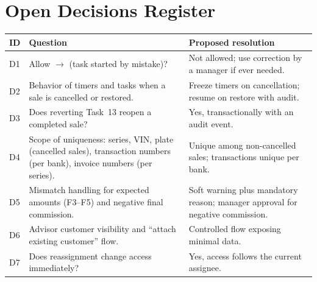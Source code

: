 \documentclass[11pt,a4paper]{article}
\newcommand{\code}[1]{\texttt{\detokenize{#1}}}
\begin{document}
\appendix
\section{Open Decisions Register}\label{app:open}

\begin{longtable}{@{}L{1.0cm}L{8.2cm}L{6.6cm}@{}}
	\toprule
	\textbf{ID} & \textbf{Question}                                                                                                        & \textbf{Proposed resolution}                                                         \\
	\midrule
	\endhead
	D1          & Allow \code{in_progress} $\rightarrow$ \code{pending} (task started by mistake)?                                         & Not allowed; use correction by a manager if ever needed.                             \\
	D2          & Behavior of timers and tasks when a sale is cancelled or restored.                                                       & Freeze timers on cancellation; resume on restore with audit.                         \\
	D3          & Does reverting Task~13 reopen a completed sale?                                                                          & Yes, transactionally with an audit event.                                            \\
	D4          & Scope of uniqueness: series, VIN, plate (cancelled sales), transaction numbers (per bank), invoice numbers (per series). & Unique among non-cancelled sales; transactions unique per bank.                      \\
	D5          & Mismatch handling for expected amounts (F3--F5) and negative final commission.                                           & Soft warning plus mandatory reason; manager approval for negative commission.        \\
	D6          & Advisor customer visibility and ``attach existing customer'' flow.                                                       & Controlled flow exposing minimal data.                                               \\
	D7          & Does reassignment change access immediately?                                                                             & Yes, access follows the current assignee.                                            \\

\end{longtable}
\end{document}
